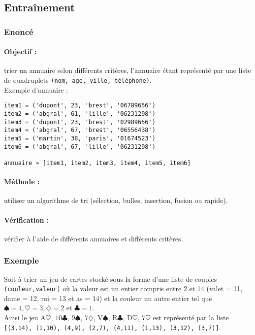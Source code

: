 \subsection{Entraînement}

\subsubsection{Enoncé}

\paragraph{Objectif :} trier un annuaire selon différents critères, l'annuaire étant
représenté par une liste de quadruplets \texttt{(nom, age, ville, téléphone)}.\\
Exemple d'annuaire :
\begin{minipage}[t]{7cm}
\begin{Verbatim}
item1 = ('dupont', 23, 'brest', '06789656')
item2 = ('abgral', 61, 'lille', '06231298')
item3 = ('dupont', 23, 'brest', '02989656')
item4 = ('abgral', 67, 'brest', '06556438')
item5 = ('martin', 38, 'paris', '01674523')
item6 = ('abgral', 67, 'lille', '06231298')

annuaire = [item1, item2, item3, item4, item5, item6]
\end{Verbatim}
\end{minipage}

\paragraph{Méthode :} utiliser un algorithme de tri (sélection, bulles, insertion, fusion ou rapide).

\paragraph{Vérification :} vérifier à l'aide de différents annuaires et différents critères.

\subsubsection{Exemple}
Soit à trier un jeu de cartes stocké sous la forme d'une liste de couples 
{\tt (couleur,valeur)} où la valeur est un entier compris entre 2 et 14 
(valet = 11, dame = 12, roi = 13 et as = 14) et la couleur un autre entier tel que 
$\spadesuit = 4, \heartsuit = 3,  \diamondsuit = 2 \mbox{ et } \clubsuit = 1$.\\
Ainsi le jeu 
A$\heartsuit$, $10\clubsuit$, $9\spadesuit$, $7\diamondsuit$, V$\spadesuit$, R$\clubsuit$, D$\heartsuit$, $7\heartsuit$ est représenté par la liste 
{\tt [(3,14), (1,10), (4,9), (2,7), (4,11), (1,13), (3,12), (3,7)]}.



